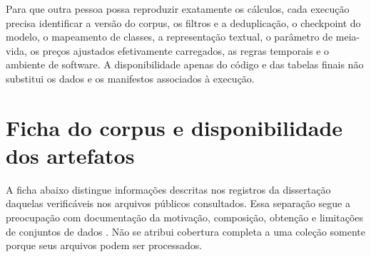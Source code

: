 Para que outra pessoa possa reproduzir exatamente os cálculos, cada execução precisa identificar a versão do corpus, os filtros e a deduplicação, o checkpoint do modelo, o mapeamento de classes, a representação textual, o parâmetro de meia-vida, os preços ajustados efetivamente carregados, as regras temporais e o ambiente de software. A disponibilidade apenas do código e das tabelas finais não substitui os dados e os manifestos associados à execução.


\section{Ficha do corpus e disponibilidade dos artefatos}

A ficha abaixo distingue informações descritas nos registros da dissertação daquelas verificáveis nos arquivos públicos consultados. Essa separação segue a preocupação com documentação da motivação, composição, obtenção e limitações de conjuntos de dados \cite{gebru2021datasheets}. Não se atribui cobertura completa a uma coleção somente porque seus arquivos podem ser processados.

